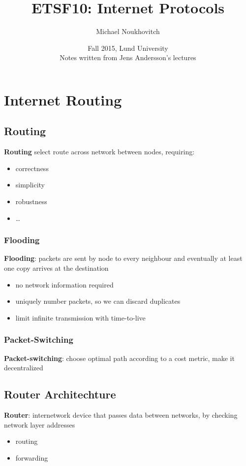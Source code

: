 \documentclass[]{article}
\theoremstyle{definition}
\begin{document}
	\let\ref\Cref

	\title{\bf{ETSF10: Internet Protocols}}
	\date{Fall 2015, Lund University \\ \center Notes written from Jens Andersson's lectures}
	\author{Michael Noukhovitch}

	\maketitle
	\newpage
	\tableofcontents
	\newpage

	\section{Internet Routing}
	\subsection{Routing}
	\textbf{Routing} select route across network between nodes, requiring:
	\begin{itemize}
		\item correctness
		\item simplicity
		\item robustness
		\item \dots
	\end{itemize}

	\subsubsection{Flooding}
	\textbf{Flooding}: packets are sent by node to every neighbour and eventually at least one copy arrives at the destination
	\begin{itemize}
		\item no network information required
		\item uniquely number packets, so we can discard duplicates
		\item limit infinite transmission with time-to-live
	\end{itemize}

	\subsubsection{Packet-Switching}
	\textbf{Packet-switching}: choose optimal path according to a cost metric, make it decentralized

	\subsection{Router Architechture}
	\textbf{Router}: internetwork device that passes data between networks, by checking network layer addresses
	\begin{itemize}
		\item routing
		\item forwarding
	\end{itemize}
\end{document}
